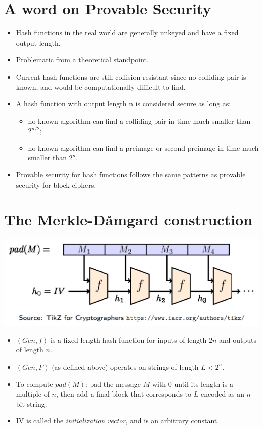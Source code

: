 \section{A word on Provable Security}
	\begin{itemize}
	    \item Hash functions in the real world are generally unkeyed and have a fixed output length.
	    \item Problematic from a theoretical standpoint.
	    \item Current hash functions are still collision resistant since no colliding pair is known, and would be computationally difficult to find.
	    \item A hash function with output length n is considered secure as long as:
	    \begin{itemize}
	        \item no known algorithm can find a colliding pair in time much smaller than $2^{n/2}$;
	        \item no known algorithm can find a preimage or second preimage in time much smaller than $2^n$.
	    \end{itemize}
	    \item Provable security for hash functions follows the same patterns as provable security for block ciphers.
	\end{itemize}

\section{The Merkle-Dåmgard construction}
   	\begin{center}
		\includegraphics[width=140mm]{Graphics/Hash Functions/hf5.png}
	\end{center}
    \begin{itemize}
        \item $(Gen,f)$ is a fixed-length hash function for inputs of length $2n$ and outputs of length $n$.
        \item $(Gen,F)$ (as defined above) operates on strings of length $L < 2^n$.
        \item To compute $pad(M)$: pad the message $M$ with 0 until its length is a multiple of $n$, then add a final block that corresponds to $L$ encoded as an $n$-bit string.
        \item IV is called the \textit{initialization vector}, and is an arbitrary constant.
    \end{itemize}

